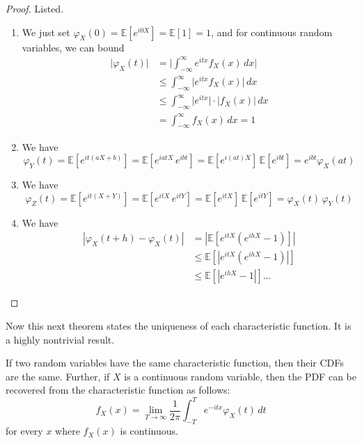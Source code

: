     \begin{proof}
      Listed. 
      \begin{enumerate}
        \item We just set $\varphi_X (0) = \mathbb{E}[e^{i 0 X}] = \mathbb{E}[1] = 1$, and for continuous random variables, we can bound 
        \begin{align*}
          \big| \varphi_X (t) \big| & = \bigg| \int_{-\infty}^\infty e^{i t x} f_X (x) \,dx  \bigg| \\
          & \leq \int_{-\infty}^\infty \big| e^{i t x} f_X (x) \big| \,dx \\
          & \leq \int_{-\infty}^\infty \big| e^{i t x} \big| \cdot \big|f_X (x) \big| \,dx \\
          & = \int_{-\infty}^\infty f_X (x) \,dx = 1 
        \end{align*}
        
        \item We have 
        \begin{equation}
          \varphi_Y (t) = \mathbb{E}[ e^{i t (a X + b)}] = \mathbb{E}[ e^{i a t X} \, e^{i b t}] = \mathbb{E}[ e^{i (at) X}] \, \mathbb{E}[e^{i b t}] = e^{i b t} \varphi_X (a t)
        \end{equation}
        
        \item We have 
        \begin{equation}
          \varphi_Z (t) = \mathbb{E}[ e^{i t (X + Y)}] = \mathbb{E}[ e^{i t X} \, e^{i t Y}] = \mathbb{E}[e^{i t X}] \, \mathbb{E}[e^{i t Y}] = \varphi_X (t) \, \varphi_Y (t)
        \end{equation}
        
        \item We have 
        \begin{align*}
          | \varphi_X (t + h) - \varphi_X (t)| & = | \mathbb{E} [ e^{i tX} (e^{i h X} - 1)] | \\ 
          & \leq \mathbb{E}[ | e^{i tX} (e^{i h X} - 1)|] \\
          & \leq \mathbb{E}[ |e^{i h X} - 1|] \ldots
        \end{align*}
      \end{enumerate}
    \end{proof}

    Now this next theorem states the uniqueness of each characteristic function. It is a highly nontrivial result. 

    \begin{theorem}
      If two random variables have the same characteristic function, then their CDFs are the same. Further, if $X$ is a continuous random variable, then the PDF can be recovered from the characteristic function as follows: 
      \begin{equation}
        f_X (x) = \lim_{T \rightarrow \infty} \frac{1}{2 \pi} \int_{-T}^T e^{- i t x} \varphi_X (t) \,dt
      \end{equation}
      for every $x$ where $f_X (x)$ is continuous. 
    \end{theorem}

